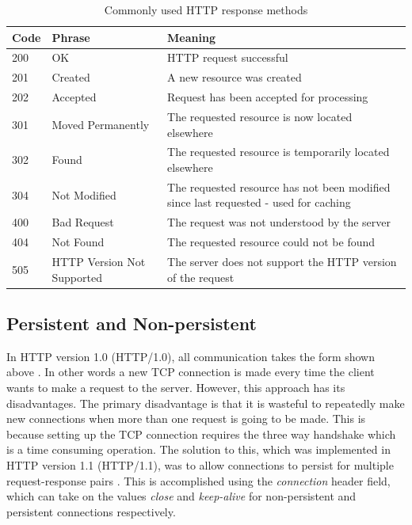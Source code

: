 \documentclass[10pt,twocolumn]{witseiepaper}
\begin{document}
	\begin{table}[tb]
		\centering
		\caption{Commonly used HTTP response methods}
		\label{httpresps}
		\begin{tabular}{p{}|p{}|p{}}
			\hline
			\textbf{Code} & \textbf{Phrase} & \textbf{Meaning} \\ \hline
			200 & OK & HTTP request successful \\
			201 & Created & A new resource was created \\
			202 & Accepted & Request has been accepted for processing \\
			301 & Moved Permanently & The requested resource is now located elsewhere \\
			302 & Found & The requested resource is temporarily located elsewhere \\
			304 & Not Modified & The requested resource has not been modified since last requested - used for caching \\
			400 & Bad Request & The request was not understood by the server \\
			404 & Not Found & The requested resource could not be found \\
			505 & HTTP Version Not Supported & The server does not support the HTTP version of the request \\
			\hline
		\end{tabular}
	\end{table}

	\subsection{Persistent and Non-persistent} \label{pvnp}

	In HTTP version 1.0 (HTTP/1.0), all communication takes the form shown above \cite{rfc1945}. In other words a new TCP connection is made every time the client wants to make a request to the server. However, this approach has its disadvantages. The primary disadvantage is that it is wasteful to repeatedly make new connections when more than one request is going to be made. This is because setting up the TCP connection requires the three way handshake which is a time consuming operation. The solution to this, which was implemented in HTTP version 1.1 (HTTP/1.1), was to allow connections to persist for multiple request-response pairs \cite{rfc7230}. This is accomplished using the \emph{connection} header field, which can take on the values \emph{close} and \emph{keep-alive} for non-persistent and persistent connections respectively.
\end{document}
